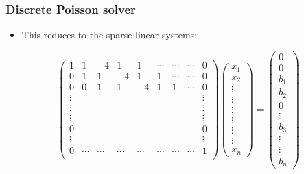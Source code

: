 \documentclass{beamer}
\begin{document}
\begin{frame}
    \frametitle{Discrete Poisson solver}    
    \begin{itemize}
        \item This reduces to the sparse linear systems:        
    \end{itemize}
    \[    
        \begin{pmatrix}
        1 & 1 & -4 & 1 &  1  & \cdots & \cdots & \cdots &  0\\
        0 & 1 & 1 & -4 & 1 & 1 & \cdots & \cdots & 0 \\
        0 & 0 & 1 & 1 & -4 & 1 & 1 & \cdots & 0 \\
        \vdots &  &  &  &  &  &  &  &  \vdots \\
        \vdots &  &  &  &  &  &  &  &  \vdots \\
        \vdots &  &  &  &  &  &  &  &  \vdots \\
        0 &  &  &  &  &  &  &  &  0 \\
        \vdots &  &  &  &  &  &  &  &  \vdots \\
        0 & \cdots & \cdots & \cdots & \cdots & \cdots & \cdots & \cdots & 1 \\
        \end{pmatrix}
        \begin{pmatrix}
            x_1 \\
            x_2 \\
            \vdots\\
            \vdots\\
            \vdots\\
            \vdots\\
            \vdots\\
            \vdots\\            
            x_n 
        \end{pmatrix} = 
        \begin{pmatrix}
            0 \\
            0 \\
            b_1\\
            b_2\\
            0 \\
            \vdots\\
            b_3\\
            \vdots\\            
            \vdots\\            
            b_n 
        \end{pmatrix}
    \]
\end{frame} 
\end{document}
